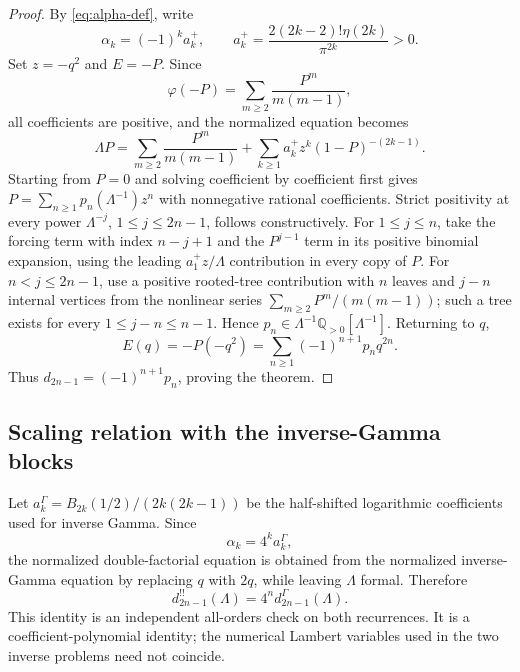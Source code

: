 \documentclass[11pt,a4paper,oneside]{article}
\theoremstyle{plain}
\theoremstyle{definition}
\theoremstyle{remark}
\newcommand{\Q}{\mathbb Q}
\newcommand{\etaD}{\eta}
\begin{document}
\begin{proof}
By \cref{eq:alpha-def}, write
\begin{equation}
 \alpha_k=(-1)^k a_k^+,
 \qquad
 a_k^+=\frac{2(2k-2)!\etaD(2k)}{\pi^{2k}}>0.
 \label{eq:alpha-positive}
\end{equation}
Set $z=-q^2$ and $E=-P$.  Since
\begin{equation}
 \varphi(-P)=\sum_{m\ge2}\frac{P^m}{m(m-1)},
 \label{eq:varphi-positive}
\end{equation}
all coefficients are positive, and the normalized equation becomes
\begin{equation}
 \Lambda P=
 \sum_{m\ge2}\frac{P^m}{m(m-1)}
 +\sum_{k\ge1}a_k^+z^k(1-P)^{-(2k-1)}.
 \label{eq:positive-fixed-point}
\end{equation}
Starting from $P=0$ and solving coefficient by coefficient first gives
$P=\sum_{n\ge1}p_n(\Lambda^{-1})z^n$ with nonnegative rational
coefficients.  Strict positivity at every power
$\Lambda^{-j}$, $1\le j\le2n-1$, follows constructively.  For
$1\le j\le n$, take the forcing term with index $n-j+1$ and the
$P^{j-1}$ term in its positive binomial expansion, using the leading
$a_1^+z/\Lambda$ contribution in every copy of $P$.  For
$n<j\le2n-1$, use a positive rooted-tree contribution with $n$ leaves and
$j-n$ internal vertices from the nonlinear series
$\sum_{m\ge2}P^m/(m(m-1))$; such a tree exists for every
$1\le j-n\le n-1$.  Hence
$p_n\in\Lambda^{-1}\Q_{>0}[\Lambda^{-1}]$.  Returning to $q$,
\[
 E(q)=-P(-q^2)=\sum_{n\ge1}(-1)^{n+1}p_nq^{2n}.
\]
Thus $d_{2n-1}=(-1)^{n+1}p_n$, proving the theorem.
\end{proof}

\subsection{Scaling relation with the inverse-Gamma blocks}

Let $a_k^{\Gamma}=B_{2k}(1/2)/(2k(2k-1))$ be the half-shifted logarithmic
coefficients used for inverse Gamma.  Since
\begin{equation}
 \alpha_k=4^k a_k^{\Gamma},
 \label{eq:alpha-gamma-scale}
\end{equation}
the normalized double-factorial equation is obtained from the normalized
inverse-Gamma equation by replacing $q$ with $2q$, while leaving $\Lambda$
formal.  Therefore
\begin{equation}
 d_{2n-1}^{!!}(\Lambda)=4^n d_{2n-1}^{\Gamma}(\Lambda).
 \label{eq:inverse-gamma-scaling}
\end{equation}
This identity is an independent all-orders check on both recurrences.  It is a
coefficient-polynomial identity; the numerical Lambert variables used in the
two inverse problems need not coincide.
\end{document}
